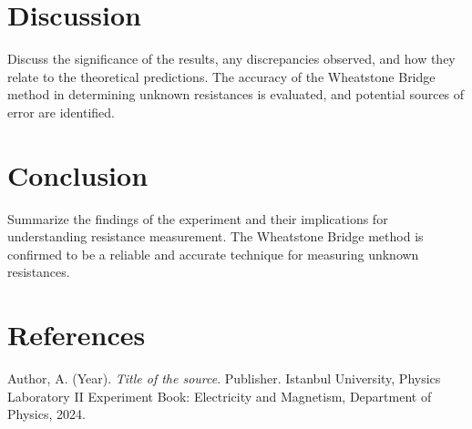 \documentclass[journal]{IEEEtran}
\begin{document}
\section{Discussion}
Discuss the significance of the results, any discrepancies observed, and how they relate to the theoretical predictions. The accuracy of the Wheatstone Bridge method in determining unknown resistances is evaluated, and potential sources of error are identified.

\section{Conclusion}
Summarize the findings of the experiment and their implications for understanding resistance measurement. The Wheatstone Bridge method is confirmed to be a reliable and accurate technique for measuring unknown resistances.

\section{References}
\begin{thebibliography}{9}
     Author, A. (Year). \textit{Title of the source}. Publisher.
     Istanbul University, Physics Laboratory II Experiment Book: Electricity and Magnetism, Department of Physics, 2024.
\end{thebibliography}
\end{document}

